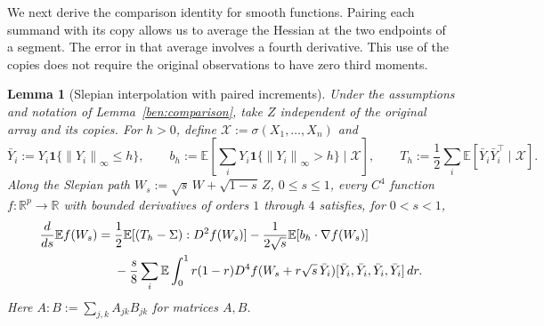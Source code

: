 \documentclass[11pt,letterpaper,twoside,leqno]{article}
\theoremstyle{bookplain}
\newtheorem{lemma}{Lemma}
\theoremstyle{bookremark}
\newcommand{\E}{\mathbb E}
\newcommand{\R}{\mathbb R}
\newcommand{\norm}[1]{\left\lVert#1\right\rVert}
\newcommand{\ind}{\mathbf 1}
\begin{document}
We next derive the comparison identity for smooth functions.
Pairing each summand with its copy allows us to average the
Hessian at the two endpoints of a segment. The error in that
average involves a fourth derivative. This use of the copies
does not require the original observations to have zero third moments.

\begin{lemma}[Slepian interpolation with paired increments]
\label{ben:paired-interpolation}
Under the assumptions and notation of Lemma~\ref{ben:comparison},
take $Z$ independent of the original array and its copies. For
$h>0$, define $\mathcal X:=\sigma(X_1,\ldots,X_n)$ and
\[
 \bar Y_i:=Y_i\ind\{\norm{Y_i}_\infty\le h\},\qquad
 b_h:=\E\left[\sum_iY_i\ind\{\norm{Y_i}_\infty>h\}
                    \mid\mathcal X\right],\qquad
 T_h:=\frac12\sum_i\E[\bar Y_i\bar Y_i^\top\mid\mathcal X].
\]
Along the Slepian path
$W_s:=\sqrt s\,W+\sqrt{1-s}\,Z$, $0\le s\le1$,
every $C^4$ function $f:\R^p\to\R$ with bounded derivatives
of orders $1$ through $4$ satisfies, for $0<s<1$,
\begin{align}
 \frac d{ds}\E f(W_s)
 ={}&\frac12\E[(T_h-\Sigma):D^2f(W_s)]
       -\frac1{2\sqrt s}\E[b_h\cdot\nabla f(W_s)]\notag\\
 &-\frac{s}{8}\sum_i\E\int_0^1 r(1-r)
 D^4f(W_s+r\sqrt s\,\bar Y_i)
          [\bar Y_i,\bar Y_i,\bar Y_i,\bar Y_i]\,dr.
 \label{ben:slepian-identity}
\end{align}
Here $A:B:=\sum_{j,k}A_{jk}B_{jk}$ for matrices $A,B$.
\end{lemma}
\end{document}
